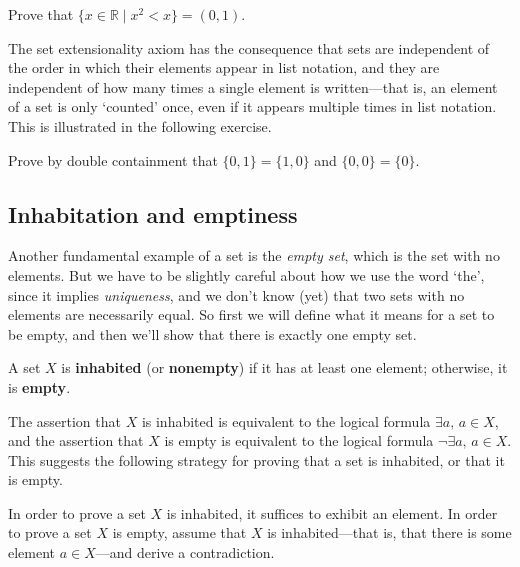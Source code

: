 \begin{exercise}
Prove that $\{ x \in \mathbb{R} \mid x^2 < x \} = (0,1)$.
\end{exercise}

The set extensionality axiom has the consequence that sets are independent of the order in which their elements appear in list notation, and they are independent of how many times a single element is written---that is, an element of a set is only `counted' once, even if it appears multiple times in list notation. This is illustrated in the following exercise.

\begin{exercise}
Prove by double containment that $\{ 0, 1 \} = \{ 1, 0 \}$ and $\{ 0, 0 \} = \{ 0 \}$.
\end{exercise}

\subsection*{Inhabitation and emptiness}

Another fundamental example of a set is the \textit{empty set}, which is the set with no elements. But we have to be slightly careful about how we use the word `the', since it implies \textit{uniqueness}, and we don't know (yet) that two sets with no elements are necessarily equal. So first we will define what it means for a set to be empty, and then we'll show that there is exactly one empty set.

\begin{definition}
\label{defInhabited}
\label{defEmptyProperty}
A set $X$ is \textbf{inhabited} (or \textbf{nonempty}) if it has at least one element; otherwise, it is \textbf{empty}.
\end{definition}

The assertion that $X$ is inhabited is equivalent to the logical formula $\exists a,\, a \in X$, and the assertion that $X$ is empty is equivalent to the logical formula $\neg \exists a,\, a \in X$. This suggests the following strategy for proving that a set is inhabited, or that it is empty.

\begin{strategy}
In order to prove a set $X$ is inhabited, it suffices to exhibit an element. In order to prove a set $X$ is empty, assume that $X$ is inhabited---that is, that there is some element $a \in X$---and derive a contradiction.
\end{strategy}

